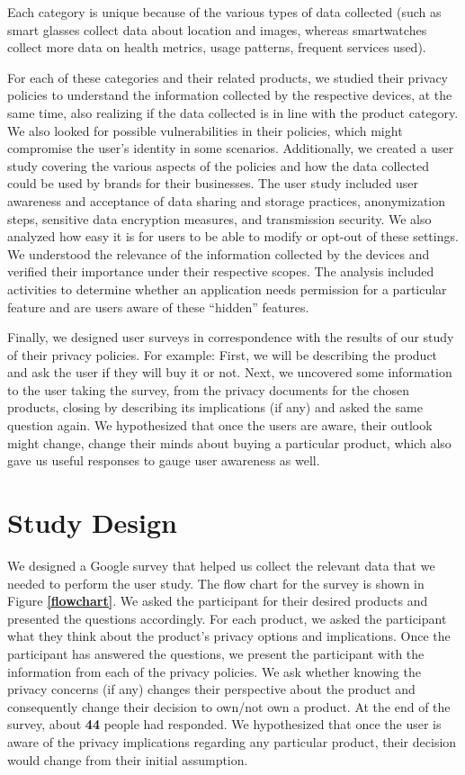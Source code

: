 \documentclass[sigconf]{acmart}
\begin{document}
Each category is unique because of the various types of data collected (such as smart glasses collect data about location and images, whereas smartwatches collect more data on health metrics, usage patterns, frequent services used).

For each of these categories and their related products, we studied their privacy policies to understand the information collected by the respective devices, at the same time, also realizing if the data collected is in line with the product category. We also looked for possible vulnerabilities in their policies, which might compromise the user’s identity in some scenarios. Additionally, we created a user study \cite{privacyproject} covering the various aspects of the policies and how the data collected could be used by brands for their businesses. The user study included user awareness and acceptance of data sharing and storage practices, anonymization steps, sensitive data encryption measures, and transmission security. We also analyzed how easy it is for users to be able to modify or opt-out of these settings. We understood the relevance of the information collected by the devices and verified their importance under their respective scopes. The analysis included activities to determine whether an application needs permission for a particular feature and are users aware of these “hidden” features. 

Finally, we designed user surveys in correspondence with the results of our study of their privacy policies. For example: First, we will be describing the product and ask the user if they will buy it or not. Next, we uncovered some information to the user taking the survey, from the privacy documents for the chosen products, closing by describing its implications (if any) and asked the same question again. We hypothesized that once the users are aware, their outlook might change, change their minds about buying a particular product, which also gave us useful responses to gauge user awareness as well.


\section{Study Design} \label{studyDesign}

We designed a Google survey that helped us collect the relevant data that we needed to perform the user study. The flow chart for the survey is shown in Figure \textbf{\ref{flowchart}}. We asked the participant for their desired products and presented the questions accordingly. For each product, we asked the participant what they think about the product’s privacy options and implications. Once the participant has answered the questions, we present the participant with the information from each of the privacy policies. We ask whether knowing the privacy concerns (if any) changes their perspective about the product and consequently change their decision to own/not own a product. At the end of the survey, about \textbf{44} people had responded. We hypothesized that once the user is aware of the privacy implications regarding any particular product, their decision would change from their initial assumption. 
\end{document}
